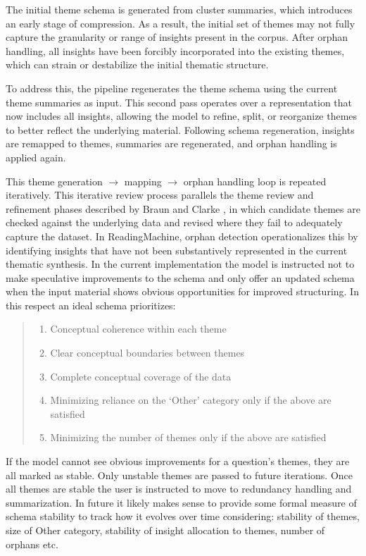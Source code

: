 \documentclass[
  11pt,
]{article}
\providecommand{\tightlist}{%
  \setlength{\itemsep}{0pt}\setlength{\parskip}{0pt}}
\begin{document}
The initial theme schema is generated from cluster summaries, which
introduces an early stage of compression. As a result, the initial set
of themes may not fully capture the granularity or range of insights
present in the corpus. After orphan handling, all insights have been
forcibly incorporated into the existing themes, which can strain or
destabilize the initial thematic structure.

To address this, the pipeline regenerates the theme schema using the
current theme summaries as input. This second pass operates over a
representation that now includes all insights, allowing the model to
refine, split, or reorganize themes to better reflect the underlying
material. Following schema regeneration, insights are remapped to
themes, summaries are regenerated, and orphan handling is applied again.

This theme generation $\rightarrow$ mapping $\rightarrow$ orphan handling loop is repeated
iteratively. This iterative review process parallels the theme review
and refinement phases described by Braun and Clarke \cite{braun2006}, in which
candidate themes are checked against the underlying data and revised
where they fail to adequately capture the dataset. In ReadingMachine,
orphan detection operationalizes this by identifying insights that have
not been substantively represented in the current thematic synthesis. In
the current implementation the model is instructed not to make
speculative improvements to the schema and only offer an updated schema
when the input material shows obvious opportunities for improved
structuring. In this respect an ideal schema prioritizes:

\begin{quote}
\begin{enumerate}
\def\labelenumi{\arabic{enumi}.}
\tightlist
\item
  Conceptual coherence within each theme
\item
  Clear conceptual boundaries between themes
\item
  Complete conceptual coverage of the data
\item
  Minimizing reliance on the `Other' category only if the above are
  satisfied
\item
  Minimizing the number of themes only if the above are satisfied
\end{enumerate}
\end{quote}

If the model cannot see obvious improvements for a question's themes,
they are all marked as stable. Only unstable themes are passed to future
iterations. Once all themes are stable the user is instructed to move to
redundancy handling and summarization. In future it likely makes sense
to provide some formal measure of schema stability to track how it
evolves over time considering: stability of themes, size of Other
category, stability of insight allocation to themes, number of orphans
etc.
\end{document}
